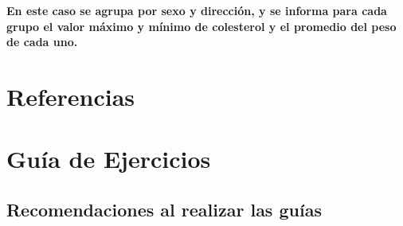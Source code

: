 \documentclass[
  letterpaper,
  DIV=11,
  numbers=noendperiod]{scrreprt}
\newlength{\cslhangindent}
\newenvironment{CSLReferences}[2] %
 {\begin{list}{}{%
  \setlength{\itemindent}{0pt}
  \setlength{\leftmargin}{0pt}
  \setlength{\parsep}{0pt}
  \ifodd #1
   \setlength{\leftmargin}{\cslhangindent}
   \setlength{\itemindent}{-1\cslhangindent}
  \fi
  \setlength{\itemsep}{#2\baselineskip}}}
 {\end{list}}
\begin{document}
\textbf{En este caso se agrupa por sexo y dirección, y se informa para
cada grupo el valor máximo y mínimo de colesterol y el promedio del peso
de cada uno.}


\chapter*{Referencias}\label{referencias}


\label{refs}
\begin{CSLReferences}{0}{1}
\end{CSLReferences}


\chapter*{Guía de Ejercicios}\label{guuxeda-de-ejercicios}


\section*{Recomendaciones al realizar las
guías}\label{recomendaciones-al-realizar-las-guuxedas}

\end{document}
